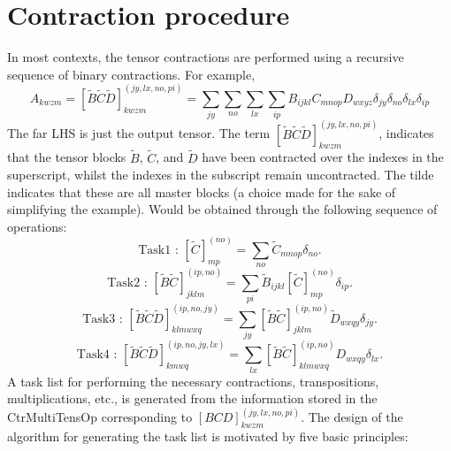 \section{ Contraction procedure } 
\noindent In most contexts, the tensor contractions are performed using a recursive sequence of binary contractions. For example,
\begin{equation}
A_{kwzm} = 
[\tilde{B}\tilde{C}\tilde{D}]^{(jy,lx,no,pi)}_{kwzm} = \sum_{jy}\sum_{no}\sum_{lx}\sum_{ip} B_{ijkl}C_{mnop}D_{wxyz} \delta_{jy} \delta_{no} \delta_{lx}\delta_{ip}
\end{equation}
The far LHS is just the output tensor. 
The term $[\tilde{B}\tilde{C}\tilde{D}]^{(jy,lx,no,pi)}_{kwzm}$, indicates that the tensor blocks
$\tilde{B}$, $\tilde{C}$, and $\tilde{D}$ have been contracted over the indexes in the superscript, whilst
the indexes in the subscript remain uncontracted. The tilde indicates that these are
all master blocks (a choice made for the sake of simplifying the example). 
Would be obtained  through the following sequence of operations:
\begin{equation}
\text{Task1 \ : \ \ }
[\tilde{C}]^{(no)}_{mp} = \sum_{no} \tilde{C}_{mnop}\delta_{no}.
\label{eqn:ctr_list_t1}
\end{equation}
\begin{equation}
\text{Task2 \ : \ \ }
[\tilde{B}\tilde{C}]^{(ip,no)}_{jklm} = \sum_{pi} \tilde{B}_{ijkl}[\tilde{C}]_{mp}^{(no)}\delta_{ip}.
\label{eqn:ctr_list_t2}
\end{equation}
\begin{equation}
\text{Task3 \ : \ \ }
[\tilde{B}\tilde{C}\tilde{D}]^{(ip,no,jy)}_{klmwxq} = \sum_{jy} [\tilde{B}\tilde{C}]^{(ip,no)}_{jklm}
 \tilde{D}_{wxqy}\delta_{jy}.
\label{eqn:ctr_list_t3}
\end{equation}
\begin{equation}
\text{Task4 \ : \ \ }
[\tilde{B}\tilde{C}\tilde{D}]^{(ip,no,jy,lx)}_{kmwq} = \sum_{lx} [\tilde{B}\tilde{C}]^{(ip,no)}_{klmwxq} D_{wxqy}\delta_{lx}.
\label{eqn:ctr_list_t4}
\end{equation}
A task list for performing the necessary contractions, transpositions, multiplications, etc.,
is generated from the information stored in the CtrMultiTensOp corresponding to $[BCD]^{(jy,lx,no,pi)}_{kwzm}$.
The design of the algorithm for generating the task list is motivated by five basic principles: 
